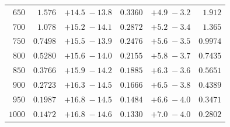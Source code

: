 \begin{landscape}
\begin{table}
\begin{center}
\begin{tabular}{r|rc|rc|r}
 $ 650$ & $  1.576$ & $ +14.5 \; -\!13.8$ & $ 0.3360$ & $ +4.9 \; -\!3.2$   & $      1.912$ \\ 
 $ 700$ & $  1.078$ & $ +15.2 \; -\!14.1$ & $ 0.2872$ & $ +5.2 \; -\!3.4$   & $      1.365$ \\ 
 $ 750$ & $ 0.7498$ & $ +15.5 \; -\!13.9$ & $ 0.2476$ & $ +5.6 \; -\!3.5$   & $     0.9974$ \\ 
 $ 800$ & $ 0.5280$ & $ +15.6 \; -\!14.0$ & $ 0.2155$ & $ +5.8 \; -\!3.7$   & $     0.7435$ \\ 
 $ 850$ & $ 0.3766$ & $ +15.9 \; -\!14.2$ & $ 0.1885$ & $ +6.3 \; -\!3.6$   & $     0.5651$ \\ 
 $ 900$ & $ 0.2723$ & $ +16.3 \; -\!14.5$ & $ 0.1666$ & $ +6.5 \; -\!3.8$   & $     0.4389$ \\ 
 $ 950$ & $ 0.1987$ & $ +16.8 \; -\!14.5$ & $ 0.1484$ & $ +6.6 \; -\!4.0$   & $     0.3471$ \\ 
 $1000$ & $ 0.1472$ & $ +16.8 \; -\!14.6$ & $ 0.1330$ & $ +7.0 \; -\!4.0$   & $     0.2802$ \\ 
\hline
	\end{tabular}
	\label{tab:XS14b}
	\end{center}
\end{table}
\end{landscape}
